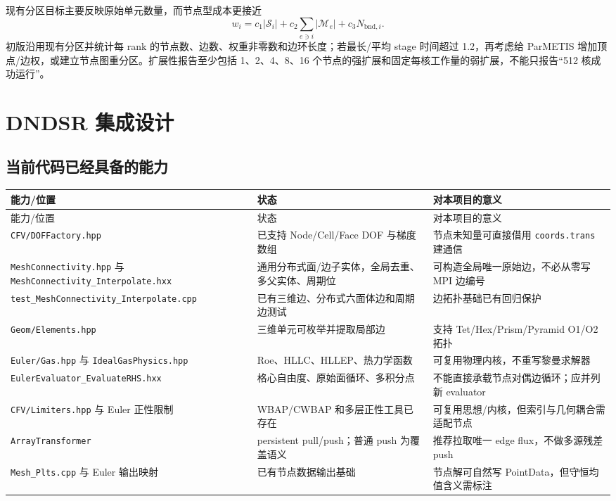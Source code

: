\documentclass[UTF8,a4paper,11pt,openany]{ctexrep}
\numberwithin{equation}{chapter}
\newcommand{\code}[1]{\texttt{#1}}
\newcommand{\pathcode}[1]{\nolinkurl{#1}}
\begin{document}
现有分区目标主要反映原始单元数量，而节点型成本更接近
\begin{equation}
  w_i=c_1|\mathcal S_i|+c_2\sum_{e\ni i}|\mathcal M_e|+c_3N_{\mathrm{bnd},i}.
\end{equation}
初版沿用现有分区并统计每 rank 的节点数、边数、权重非零数和边环长度；若最长/平均 stage 时间超过 1.2，再考虑给 ParMETIS 增加顶点/边权，或建立节点图重分区。扩展性报告至少包括 1、2、4、8、16 个节点的强扩展和固定每核工作量的弱扩展，不能只报告“512 核成功运行”。

\chapter{DNDSR 集成设计}

\section{当前代码已经具备的能力}

\begin{longtable}{>{\raggedright\arraybackslash}p{}p{}p{}}
\toprule
能力/位置 & 状态 & 对本项目的意义\\
\midrule
\endfirsthead
\toprule
能力/位置 & 状态 & 对本项目的意义\\
\midrule
\endhead
\pathcode{CFV/DOFFactory.hpp} & 已支持 Node/Cell/Face DOF 与梯度数组 & 节点未知量可直接借用 \pathcode{coords.trans} 建通信\\
\pathcode{MeshConnectivity.hpp} 与 \pathcode{MeshConnectivity_Interpolate.hxx} & 通用分布式面/边子实体，全局去重、多父实体、周期位 & 可构造全局唯一原始边，不必从零写 MPI 边编号\\
\pathcode{test_MeshConnectivity_Interpolate.cpp} & 已有三维边、分布式六面体边和周期边测试 & 边拓扑基础已有回归保护\\
\pathcode{Geom/Elements.hpp} & 三维单元可枚举并提取局部边 & 支持 Tet/Hex/Prism/Pyramid O1/O2 拓扑\\
\pathcode{Euler/Gas.hpp} 与 \pathcode{IdealGasPhysics.hpp} & Roe、HLLC、HLLEP、热力学函数 & 可复用物理内核，不重写黎曼求解器\\
\pathcode{EulerEvaluator_EvaluateRHS.hxx} & 格心自由度、原始面循环、多积分点 & 不能直接承载节点对偶边循环；应并列新 evaluator\\
\pathcode{CFV/Limiters.hpp} 与 Euler 正性限制 & WBAP/CWBAP 和多层正性工具已存在 & 可复用思想/内核，但索引与几何耦合需适配节点\\
\code{ArrayTransformer} & persistent pull/push；普通 push 为覆盖语义 & 推荐拉取唯一 edge flux，不做多源残差 push\\
\code{Mesh\_Plts.cpp} 与 Euler 输出映射 & 已有节点数据输出基础 & 节点解可自然写 PointData，但守恒均值含义需标注\\
\bottomrule
\end{longtable}
\end{document}
